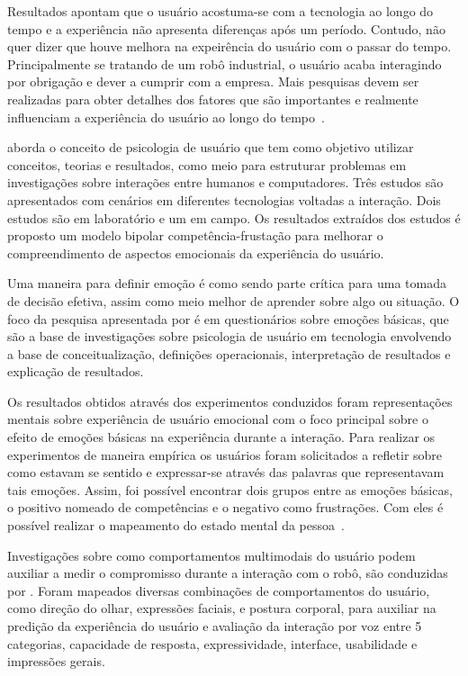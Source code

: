 Resultados apontam que o usuário acostuma-se com a tecnologia ao longo do tempo e a experiência não apresenta diferenças após um período. Contudo, não quer dizer que houve melhora na expeirência do usuário com o passar do tempo. Principalmente se tratando de um robô industrial, o usuário acaba interagindo por obrigação e dever a cumprir com a empresa. Mais pesquisas devem ser realizadas para obter detalhes dos fatores que são importantes e realmente influenciam a experiência do usuário ao longo do tempo~\cite{buchner:2013}.

 aborda o conceito de psicologia de usuário que tem como objetivo utilizar conceitos, teorias e resultados, como meio para estruturar problemas em investigações sobre interações entre humanos e computadores. Três estudos são apresentados com cenários em diferentes tecnologias voltadas a interação. Dois estudos são em laboratório e um em campo. Os resultados extraídos dos estudos é proposto um modelo bipolar competência-frustação para melhorar o compreendimento de aspectos emocionais da experiência do usuário.

Uma maneira para definir emoção é como sendo parte crítica para uma tomada de decisão efetiva, assim como meio melhor de aprender sobre algo ou situação. O foco da pesquisa apresentada por  é em questionários sobre emoções básicas, que são a base de investigações sobre psicologia de usuário em tecnologia envolvendo a base de conceitualização, definições operacionais, interpretação de resultados e explicação de resultados.

Os resultados obtidos através dos experimentos conduzidos foram representações mentais sobre experiência de usuário emocional com o foco principal sobre o efeito de emoções básicas na experiência durante a interação. Para realizar os experimentos de maneira empírica os usuários foram solicitados a refletir sobre como estavam se sentido e expressar-se através das palavras que representavam tais emoções. Assim, foi possível encontrar dois grupos entre as emoções básicas, o positivo nomeado de competências e o negativo como frustrações. Com eles é possível realizar o mapeamento do estado mental da pessoa~\cite{saariluoma:2014}.

Investigações sobre como comportamentos multimodais do usuário podem auxiliar a medir o compromisso durante a interação com o robô, são conduzidas por . Foram mapeados diversas combinações de comportamentos do usuário, como direção do olhar, expressões faciais, e postura corporal, para auxiliar na predição da experiência do usuário e avaliação da interação por voz entre 5 categorias, capacidade de resposta, expressividade, interface, usabilidade e impressões gerais.

